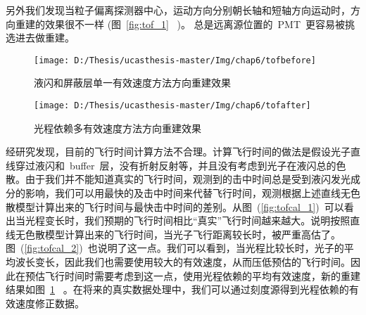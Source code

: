 另外我们发现当粒子偏离探测器中心，运动方向分别朝长轴和短轴方向运动时，方向重建的效果很不一样 (图~\ref{fig:tof_1}~ )。 总是远离源位置的~PMT~更容易被挑选进去做重建。
\begin{figure}[!htb]
\begin{minipage}[t]{0.48\linewidth}
  \centering
     \texttt{[image: D:/Thesis/ucasthesis-master/Img/chap6/tofbefore]}
    \caption{液闪和屏蔽层单一有效速度方法方向重建效果}
    \label{fig:tof_1}
  \end{minipage}%
  \quad\quad
  \begin{minipage}[t]{0.48\linewidth}
  \centering
    \texttt{[image: D:/Thesis/ucasthesis-master/Img/chap6/tofafter]}
    \caption{光程依赖多有效速度方法方向重建效果}
    \label{fig:tof_2}
  \end{minipage}
  \end{figure}
经研究发现，目前的飞行时间计算方法不合理。计算飞行时间的做法是假设光子直线穿过液闪和~buffer~层，没有折射反射等，并且没有考虑到光子在液闪总的色散。由于我们并不能知道真实的飞行时间，观测到的击中时间总是受到液闪发光成分的影响，我们可以用最快的及击中时间来代替飞行时间，观测根据上述直线无色散模型计算出来的飞行时间与最快击中时间的差别。从图~(\ref{fig:tofcal_1})~可以看出当光程变长时，我们预期的飞行时间相比``真实''飞行时间越来越大。说明按照直线无色散模型计算出来的飞行时间，当光子飞行距离较长时，被严重高估了。图~(\ref{fig:tofcal_2})~也说明了这一点。我们可以看到，当光程比较长时，光子的平均波长变长，因此我们也需要使用较大的有效速度，从而压低预估的飞行时间。因此在预估飞行时间时需要考虑到这一点，使用光程依赖的平均有效速度，新的重建结果如图~\ref{fig:tof_2}~ 。在将来的真实数据处理中，我们可以通过刻度源得到光程依赖的有效速度修正数据。
